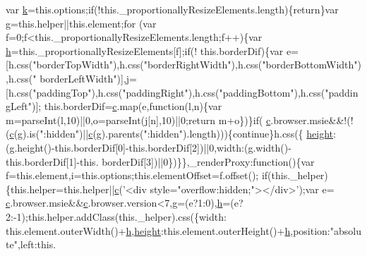 \begin{DoxyCode}
      var \hyperlink{jquery_8js_ab26645c014aa005ecedef329ecf58c99}{k}=this.options;\textcolor{keywordflow}{if}(!this.\_proportionallyResizeElements.length)\{\textcolor{keywordflow}{return}\}var g=this.helper||this.element;\textcolor{keywordflow}{for}
      (var f=0;f<this.\_proportionallyResizeElements.length;f++)\{var \hyperlink{all__1a_8js_aebecdaf2444e2be39f4804412d6a3bf8}{h}=this.\_proportionallyResizeElements[f];\textcolor{keywordflow}{if}(!
      this.borderDif)\{var e=[h.css(\textcolor{stringliteral}{"borderTopWidth"}),h.css(\textcolor{stringliteral}{"borderRightWidth"}),h.css(\textcolor{stringliteral}{"borderBottomWidth"}),h.css(\textcolor{stringliteral}{"
      borderLeftWidth"})],j=[h.css(\textcolor{stringliteral}{"paddingTop"}),h.css(\textcolor{stringliteral}{"paddingRight"}),h.css(\textcolor{stringliteral}{"paddingBottom"}),h.css(\textcolor{stringliteral}{"paddingLeft"})];
      this.borderDif=\hyperlink{jquery_8js_ad171626e81625b5e9f5cb177a3a8fb1c}{c}.map(e,\textcolor{keyword}{function}(l,n)\{var m=parseInt(l,10)||0,o=parseInt(j[n],10)||0;\textcolor{keywordflow}{return} m+o\})\}\textcolor{keywordflow}{if}(
      \hyperlink{jquery_8js_ad171626e81625b5e9f5cb177a3a8fb1c}{c}.browser.msie&&!(!(\hyperlink{jquery_8js_ad171626e81625b5e9f5cb177a3a8fb1c}{c}(g).is(\textcolor{stringliteral}{":hidden"})||\hyperlink{jquery_8js_ad171626e81625b5e9f5cb177a3a8fb1c}{c}(g).parents(\textcolor{stringliteral}{":hidden"}).length)))\{\textcolor{keywordflow}{continue}\}h.css(\{
      \hyperlink{styr_2styr_2main_8c_a48083b65ac9a863566dc3e3fff09a5b4}{height}:(g.height()-this.borderDif[0]-this.borderDif[2])||0,width:(g.width()-this.borderDif[1]-this.
      borderDif[3])||0\})\}\},\_renderProxy:\textcolor{keyword}{function}()\{var f=this.element,i=this.options;this.elementOffset=f.offset();\textcolor{keywordflow}{
      if}(this.\_helper)\{this.helper=this.helper||\hyperlink{jquery_8js_ad171626e81625b5e9f5cb177a3a8fb1c}{c}(\textcolor{stringliteral}{'<div style="overflow:hidden;"></div>'});var e=
      \hyperlink{jquery_8js_ad171626e81625b5e9f5cb177a3a8fb1c}{c}.browser.msie&&\hyperlink{jquery_8js_ad171626e81625b5e9f5cb177a3a8fb1c}{c}.browser.version<7,g=(e?1:0),\hyperlink{all__1a_8js_aebecdaf2444e2be39f4804412d6a3bf8}{h}=(e?2:-1);this.helper.addClass(this.\_helper).css(\{width:
      this.element.outerWidth()+\hyperlink{all__1a_8js_aebecdaf2444e2be39f4804412d6a3bf8}{h},\hyperlink{styr_2styr_2main_8c_a48083b65ac9a863566dc3e3fff09a5b4}{height}:this.element.outerHeight()+\hyperlink{all__1a_8js_aebecdaf2444e2be39f4804412d6a3bf8}{h},position:\textcolor{stringliteral}{"absolute"},left:this.

\end{DoxyCode}
